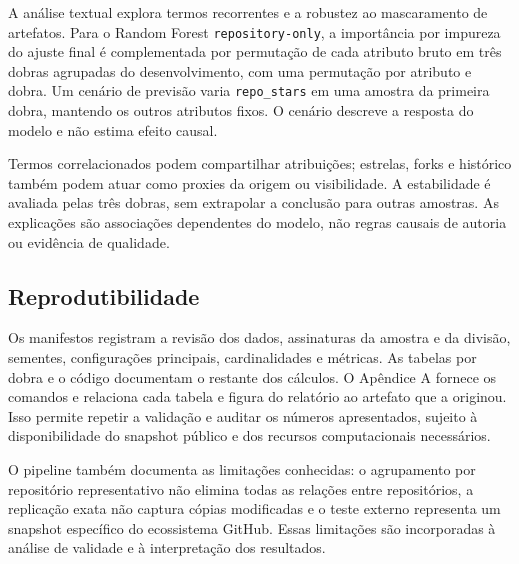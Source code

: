 A análise textual explora termos recorrentes e a robustez ao
mascaramento de artefatos. Para o Random Forest
\texttt{repository-only}, a importância por impureza do ajuste final é
complementada por permutação de cada atributo bruto em três dobras
agrupadas do desenvolvimento, com uma permutação por atributo e dobra.
Um cenário de previsão varia \texttt{repo\_stars} em uma amostra da
primeira dobra, mantendo os outros atributos fixos. O cenário descreve a
resposta do modelo e não estima efeito causal.

Termos correlacionados podem compartilhar atribuições; estrelas, forks e
histórico também podem atuar como proxies da origem ou visibilidade. A
estabilidade é avaliada pelas três dobras, sem extrapolar a conclusão
para outras amostras. As explicações são associações dependentes do
modelo, não regras causais de autoria ou evidência de qualidade.

\subsection{Reprodutibilidade}\label{reprodutibilidade}

Os manifestos registram a revisão dos dados, assinaturas da amostra e da
divisão, sementes, configurações principais, cardinalidades e métricas.
As tabelas por dobra e o código documentam o restante dos cálculos. O
Apêndice A fornece os comandos e relaciona cada tabela e figura do
relatório ao artefato que a originou. Isso permite repetir a validação e
auditar os números apresentados, sujeito à disponibilidade do snapshot
público e dos recursos computacionais necessários.

O pipeline também documenta as limitações conhecidas: o agrupamento por
repositório representativo não elimina todas as relações entre
repositórios, a replicação exata não captura cópias modificadas e o
teste externo representa um snapshot específico do ecossistema GitHub.
Essas limitações são incorporadas à análise de validade e à
interpretação dos resultados.

